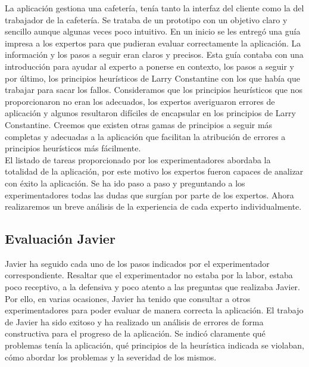 La aplicación gestiona una cafetería, tenía tanto la interfaz del cliente como la del trabajador de la cafetería. Se trataba de un prototipo con un objetivo claro 
y sencillo aunque algunas veces poco intuitivo. En un inicio se les entregó una guía impresa a los expertos para que pudieran evaluar correctamente la aplicación. 
La información y los pasos a seguir eran claros y precisos. Esta guía contaba con una introducción para ayudar al experto a ponerse en contexto, los pasos a seguir 
y por último, los principios heurísticos de Larry Constantine con los que había que trabajar para sacar los fallos. Consideramos que los principios heurísticos que 
nos proporcionaron no eran los adecuados, los expertos averiguaron errores de aplicación y algunos resultaron difíciles de encapsular en los principios de 
Larry Constantine. Creemos que existen otras gamas de principios a seguir más completas y adecuadas a la aplicación que facilitan la atribución de errores a 
principios heurísticos más fácilmente. \\ 

El listado de tareas proporcionado por los experimentadores abordaba la totalidad de la aplicación, por este motivo los expertos fueron capaces de analizar con éxito 
la aplicación. Se ha ido paso a paso y preguntando a los experimentadores todas las dudas que surgían por parte de los expertos. Ahora realizaremos un breve análisis 
de la experiencia de cada experto individualmente.

\subsection{Evaluación Javier}
Javier ha seguido cada uno de los pasos indicados por el experimentador correspondiente. Resaltar que el experimentador no estaba por la labor, estaba poco 
receptivo, a la defensiva y poco atento a las preguntas que realizaba Javier. Por ello, en varias ocasiones, Javier ha tenido que consultar a otros experimentadores 
para poder evaluar de manera correcta la aplicación. El trabajo de Javier ha sido exitoso y ha realizado un análisis de errores de forma constructiva para el 
progreso de la aplicación. Se indicó claramente qué problemas tenía la aplicación, qué principios de la heurística indicada se violaban, cómo abordar los problemas 
y la severidad de los mismos.

